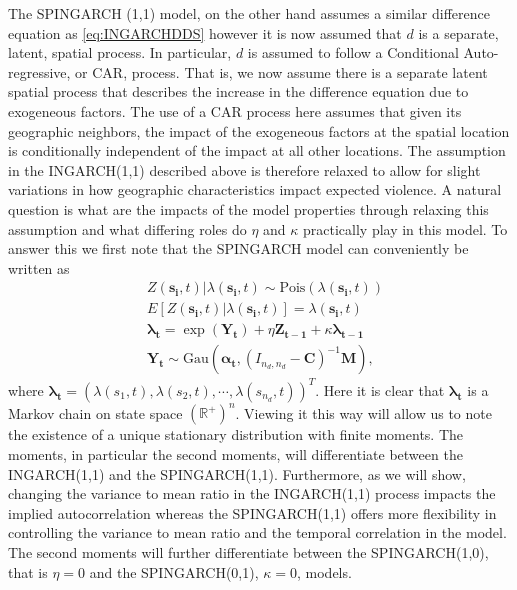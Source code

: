 \documentclass[11pt]{isuthesis}
\begin{document}
The SPINGARCH (1,1) model, on the other hand assumes a similar difference equation as \eqref{eq:INGARCHDDS} however it is now assumed that $d$ is a separate, latent, spatial process.  In particular, $d$ is assumed to follow a Conditional Auto-regressive, or CAR, process.  That is, we now assume there is a separate latent spatial process that describes the increase in the difference equation due to exogeneous factors. The use of a CAR process here assumes that given its geographic neighbors, the impact of the exogeneous factors at the spatial location is conditionally independent of the impact at all other locations.  The assumption in the INGARCH(1,1) described above is therefore relaxed to allow for slight variations in how geographic characteristics impact expected violence.  A natural question is what are the impacts of the model properties through relaxing this assumption and what differing roles do $\eta$ and $\kappa$ practically play in this model.  To answer this we first note that the SPINGARCH model can conveniently be written as
\begin{align}
	& Z(\boldsymbol{s_i},t)|\lambda(\boldsymbol{s_i},t) \sim \mbox{Pois}(\lambda(\boldsymbol{s_i},t)) \label{eq:timeseries2} \\
	& E[Z(\boldsymbol{s_i},t)|\lambda(\boldsymbol{s_i},t)]=\lambda(\boldsymbol{s_i},t)\\
	& \boldsymbol{\lambda_t} = \exp(\boldsymbol{Y_t})+\eta \boldsymbol{Z_{t-1}}+\kappa \boldsymbol{\lambda_{t-1}}\\
	& \boldsymbol{Y_t} \sim \mbox{Gau}\textit{} (\boldsymbol{\alpha_t},(I_{{n_d},{n_d}}-\boldsymbol{C})^{-1}\boldsymbol{M}),
\end{align}
where $\boldsymbol{\lambda_t}=\left(\lambda(s_1,t),\lambda(s_2,t),\cdots,\lambda(s_{n_d},t)\right)^T$.  Here it is clear that $\boldsymbol{\lambda_t}$ is a Markov chain on state space $(\mathbb{R}^{+})^n$.  Viewing it this way will allow us to note the existence of a unique stationary distribution with finite moments.  The moments, in particular the second moments, will differentiate between the INGARCH(1,1) and the SPINGARCH(1,1).  Furthermore, as we will show, changing the variance to mean ratio in the INGARCH(1,1) process impacts the implied autocorrelation whereas the SPINGARCH(1,1) offers more flexibility in controlling the variance to mean ratio and the temporal correlation in the model.  The second moments will further differentiate between the SPINGARCH(1,0), that is $\eta=0$ and the SPINGARCH(0,1), $\kappa=0$, models.  
\end{document}
